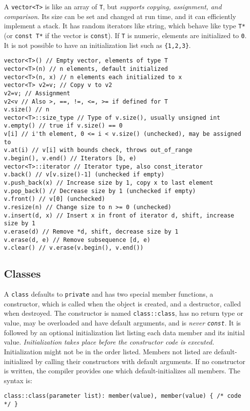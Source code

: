 			A \lstinline!vector<T>! is like an array of \lstinline!T!, but \emph{supports copying, assignment, and comparison}. Its size can be set and changed at run time, and it can efficiently implement a stack. It has random iterators like string, which behave like type \lstinline!T*! (or \lstinline!const T*! if the vector is \lstinline!const!). If \lstinline!T! is numeric, elements are initialized to \lstinline!0!. It is not possible to have an initialization list such as \lstinline!{1,2,3}!.
			\begin{code}\begin{lstlisting}[style=list]
vector<T>() // Empty vector, elements of type T
vector<T>(n) // n elements, default initialized
vector<T>(n, x) // n elements each initialized to x
vector<T> v2=v; // Copy v to v2
v2=v; // Assignment
v2<v // Also >, ==, !=, <=, >= if defined for T
v.size() // n
vector<T>::size_type // Type of v.size(), usually unsigned int
v.empty() // true if v.size() == 0
v[i] // i'th element, 0 <= i < v.size() (unchecked), may be assigned to
v.at(i) // v[i] with bounds check, throws out_of_range
v.begin(), v.end() // Iterators [b, e)
vector<T>::iterator // Iterator type, also const_iterator
v.back() // v[v.size()-1] (unchecked if empty)
v.push_back(x) // Increase size by 1, copy x to last element
v.pop_back() // Decrease size by 1 (unchecked if empty)
v.front() // v[0] (unchecked)
v.resize(n) // Change size to n >= 0 (unchecked)
v.insert(d, x) // Insert x in front of iterator d, shift, increase size by 1
v.erase(d) // Remove *d, shift, decrease size by 1
v.erase(d, e) // Remove subsequence [d, e)
v.clear() // v.erase(v.begin(), v.end())
			\end{lstlisting}\end{code}
			
		
	
	\subsection{Classes} %
		
		A \lstinline!class! defaults to \lstinline!private! and has two special member functions, a constructor, which is called when the object is created, and a destructor, called when destroyed. The constructor is named \lstinline!class::class!, has no return type or value, may be overloaded and have default arguments, and is \emph{never \lstinline!const!}. It is followed by an optional initialization list listing each data member and its initial value. \emph{Initialization takes place before the constructor code is executed.} Initialization might not be in the order listed. Members not listed are default-initialized by calling their constructors with default arguments. If no constructor is written, the compiler provides one which default-initializes all members. The syntax is:
		\begin{code}\begin{lstlisting}[style=list]
class::class(parameter list): member(value), member(value) { /* code */ }
		\end{lstlisting}\end{code}
		
